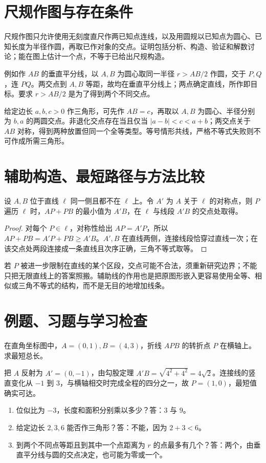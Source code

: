 \section{尺规作图与存在条件}
尺规作图只允许使用无刻度直尺作两已知点连线，以及用圆规以已知点为圆心、已知长度为半径作圆，再取已作对象的交点。证明包括分析、构造、验证和解数讨论；能在图上估计一个点，不等于已给出尺规构造。

例如作 $AB$ 的垂直平分线，以 $A,B$ 为圆心取同一半径 $r>AB/2$ 作圆，交于 $P,Q$，连 $PQ$。两交点到 $A,B$ 等距，故均在垂直平分线上；两点确定直线，所作即目标。要求 $r>AB/2$ 是为了得到两个不同交点。

给定边长 $a,b,c>0$ 作三角形，可先作 $AB=c$，再取以 $A,B$ 为圆心、半径分别为 $b,a$ 的两圆交点。非退化交点存在当且仅当 $|a-b|<c<a+b$；两交点关于 $AB$ 对称，得到两种放置但同一个全等类型。等号情形共线，严格不等式失败则不可作成所需三角形。

\section{辅助构造、最短路径与方法比较}
\begin{theorem}[反射求最短折线]
设 $A,B$ 位于直线 $\ell$ 同一侧且都不在 $\ell$ 上。令 $A'$ 为 $A$ 关于 $\ell$ 的对称点，则 $P$ 遍历 $\ell$ 时，$AP+PB$ 的最小值为 $A'B$，在 $\ell$ 与线段 $A'B$ 的交点处取得。
\end{theorem}
\begin{proof}
对每个 $P\in\ell$，对称性给出 $AP=A'P$，所以 $AP+PB=A'P+PB\ge A'B$。$A',B$ 在直线两侧，连接线段恰穿过直线一次；在该交点处两段连接成一条直线且次序正确，三角不等式取等。
\end{proof}
若 $P$ 被进一步限制在直线的某个区段，交点可能不合法，须重新研究边界；不能只把无限直线上的答案照搬。辅助线的作用也是把原图形嵌入更容易使用全等、相似或三角不等式的结构，而不是无目的地增加线条。

\section{例题、习题与学习检查}
\begin{example}
在直角坐标图中，$A=(0,1),B=(4,3)$，折线 $APB$ 的转折点 $P$ 在横轴上。求最短总长。
\end{example}
\begin{solve}
把 $A$ 反射为 $A'=(0,-1)$，由勾股定理 $A'B=\sqrt{4^2+4^2}=4\sqrt2$。连接线的竖直变化从 $-1$ 到 $3$，与横轴相交时完成全程的四分之一，故 $P=(1,0)$，最短值确实可达。
\end{solve}
\begin{enumerate}
\item 位似比为 $-3$，长度和面积分别乘以多少？答：$3$ 与 $9$。
\item 给定边长 $2,3,6$ 能否作三角形？答：不能，因为 $2+3<6$。
\item 到两个不同点等距且到其中一个点距离为 $r$ 的点最多有几个？答：两个，由垂直平分线与圆的交点决定，也可能为零或一个。
\end{enumerate}

